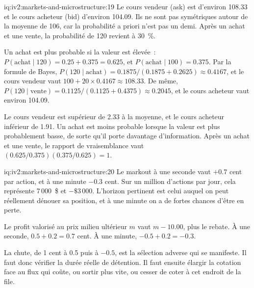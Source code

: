 \begin{solution}{iq:iv2:markets-and-microstructure:19}
Le cours vendeur (ask) est d'environ 108.33 et le cours acheteur (bid) d'environ 104.09. Ils ne sont pas symétriques autour de la moyenne de 106, car la probabilité a priori n'est pas un demi. Après un achat et une vente, la probabilité de 120 revient à 30~\%.

Un achat est plus probable si la valeur est élevée~: $P(\text{achat} \mid 120) = 0.25 + 0.375 = 0.625$, et $P(\text{achat} \mid 100) = 0.375$. Par la formule de Bayes, $P(120 \mid \text{achat}) = 0.1875/(0.1875 + 0.2625) \approx 0.4167$, et le cours vendeur vaut $100 + 20 \times 0.4167 \approx 108.33$. De même, $P(120 \mid \text{vente}) = 0.1125/(0.1125 + 0.4375) \approx 0.2045$, et le cours acheteur vaut environ 104.09.

Le cours vendeur est supérieur de 2.33 à la moyenne, et le cours acheteur inférieur de 1.91. Un achat est moins probable lorsque la valeur est plus probablement basse, de sorte qu'il porte davantage d'information. Après un achat et une vente, le rapport de vraisemblance vaut $(0.625/0.375)(0.375/0.625) = 1$.

\end{solution}

\begin{solution}{iq:iv2:markets-and-microstructure:20}
Le markout à une seconde vaut $+0.7$ cent par action, et à une minute $-0.3$ cent. Sur un million d'actions par jour, cela représente 7\,000~\$ et $-\$3\,000$. L'horizon pertinent est celui auquel on peut réellement dénouer sa position, et à une minute on a de fortes chances d'être en perte.

Le profit valorisé au prix milieu ultérieur $m$ vaut $m - 10.00$, plus le rebate. À une seconde, $0.5 + 0.2 = 0.7$ cent. À une minute, $-0.5 + 0.2 = -0.3$.

La chute, de 1 cent à 0.5 puis à $-0.5$, est la sélection adverse qui se manifeste. Il faut donc vérifier la durée réelle de détention. Il faut ensuite élargir la cotation face au flux qui coûte, ou sortir plus vite, ou cesser de coter à cet endroit de la file.

\end{solution}

